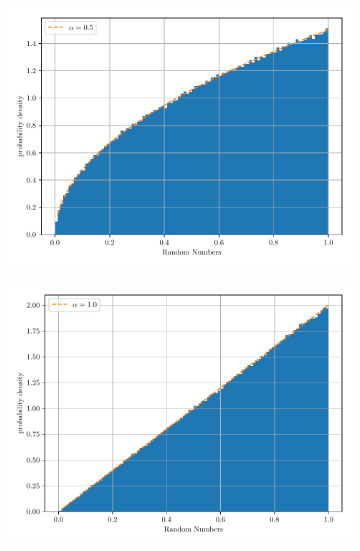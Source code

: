 \documentclass[paper=a4, fontsize=11pt]{scrartcl} %
\numberwithin{equation}{section} %
\numberwithin{figure}{section} %
\numberwithin{table}{section} %
\begin{document}
\begin{figure}[!ht]
\begin{subfigure}[b]{0.495\textwidth}
		\includegraphics[width=\linewidth]{figure_3_e.pdf}
		\label{fig:non-uniform_1:e}
	\end{subfigure}
	\begin{subfigure}[b]{0.495\textwidth}
		\centering
		\includegraphics[width=\linewidth]{figure_3_f.pdf}
		\label{fig:non-uniform_1:f}
	\end{subfigure}
	\begin{subfigure}[b]{0.495\textwidth}
		\centering

\end{subfigure}
\end{figure}
\end{document}
